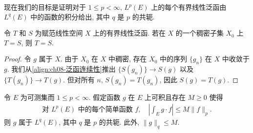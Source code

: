 \documentclass[../../main.tex]{subfiles}
\begin{document}
现在我们的目标是证明对于 $1\leqslant p<\infty$, $L^{p}(E)$ 上的每个有界线性泛函由 $L^{q}(E)$ 中的函数的积分给出, 其中 $q$ 是 $p$ 的共轭.

\begin{proposition}\label{proposition:ch08-稠密集相等}
令 $T$ 和 $S$ 为赋范线性空间 $X$ 上的有界线性泛函. 若在 $X$ 的一个稠密子集 $X_{0}$ 上 $T=S$, 则 $T=S$.
\end{proposition}

\begin{proof}
令 $g$ 属于 $X$. 由于 $X_{0}$ 在 $X$ 中稠密, 存在 $X_{0}$ 中的序列 $\{g_{n}\}$ 在 $X$ 中收敛于 $g$. 我们从\eqref{align:ch08-泛函连续性}推出 $\{S(g_{n})\}\to S(g)$ 以及 $\{T(g_{n})\}\to T(g)$. 但对所有 $n$, $S(g_{n})=T(g_{n})$, 因此 $S(g)=T(g)$.
\end{proof}

\begin{lemma}\label{lemma:ch08-积分不等式推出Lq}
令 $E$ 为可测集而 $1\leqslant p<\infty$. 假定函数 $g$ 在 $E$ 上可积且存在 $M\geqslant 0$ 使得
\begin{align}
\text{对 }L^{p}(E)\text{ 中的每个简单函数 }f,\quad\left|\int_{E}g\cdot f\right|\leqslant M\|f\|_{p}.\label{align:ch08-简单函数不等式}
\end{align}
则 $g$ 属于 $L^{q}(E)$, 其中 $q$ 是 $p$ 的共轭. 此外, $\|g\|_{q}\leqslant M$.
\end{lemma}
\end{document}
